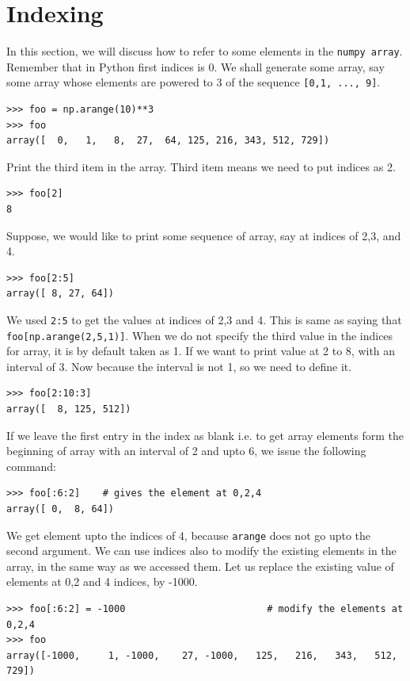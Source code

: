 \documentclass[10pt]{book}
\begin{document}
{\section{Indexing}
In this section, we will discuss how to refer to some elements in the \verb"numpy array". Remember that in Python first indices is 0. We shall generate some array, say some array whose elements are powered to 3 of the sequence \verb"[0,1, ..., 9]".
\beforeverb \begin{verbatim}
>>> foo = np.arange(10)**3
>>> foo
array([  0,   1,   8,  27,  64, 125, 216, 343, 512, 729])
\end{verbatim} \afterverb
Print the third item in the array. Third item means we need to put indices as 2.
\beforeverb \begin{verbatim}
>>> foo[2]
8
\end{verbatim} \afterverb
Suppose, we would like to print some sequence of array, say at indices of 2,3, and 4.
\beforeverb \begin{verbatim}
>>> foo[2:5] 
array([ 8, 27, 64])     
\end{verbatim} \afterverb
We used \verb"2:5" to get the values at indices of 2,3 and 4. This is same as saying that \verb"foo[np.arange(2,5,1)]". When we do not specify the third value in the indices for array, it is by default taken as 1. If we want to print value at 2 to 8, with an interval of 3. Now because the interval is not 1, so we need to define it.
\beforeverb \begin{verbatim}
>>> foo[2:10:3]    
array([  8, 125, 512])
\end{verbatim} \afterverb
If we leave the first entry in the index as blank i.e. to get array elements form the beginning of array with an interval of 2 and upto 6, we issue the following command:
\beforeverb \begin{verbatim}
>>> foo[:6:2]    # gives the element at 0,2,4
array([ 0,  8, 64])
\end{verbatim} \afterverb
We get element upto the indices of 4, because \verb"arange" does not go upto the second argument. We can use indices also to modify the existing elements in the array, in the same way as we accessed them. Let us replace the existing value of elements at 0,2 and 4 indices, by -1000.
\beforeverb \begin{verbatim}
>>> foo[:6:2] = -1000                         # modify the elements at 0,2,4
>>> foo
array([-1000,     1, -1000,    27, -1000,   125,   216,   343,   512,   729])
\end{verbatim} \afterverb
}
\end{document}
